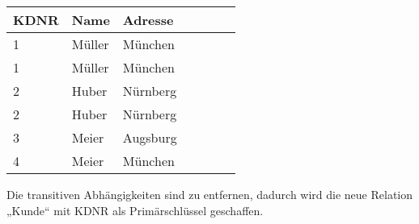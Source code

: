 \documentclass{lehramt-informatik}
\begin{document}
\begin{enumerate}
\begin{antwort}
\begin{tabular}{|l|l|l|l|l|l|l|}
\textbf{KDNR} & \textbf{Name} & \textbf{Adresse}
\\\hline
1    & Müller & München       \\
1    & Müller & München       \\
2    & Huber  & Nürnberg      \\
2    & Huber  & Nürnberg      \\
3    & Meier  & Augsburg      \\
4    & Meier  & München
\end{tabular}

Die transitiven Abhängigkeiten sind zu entfernen, dadurch wird die neue
Relation „Kunde“ mit KDNR als Primärschlüssel geschaffen.
\end{antwort}

\end{enumerate}

\literatur
\end{document}
